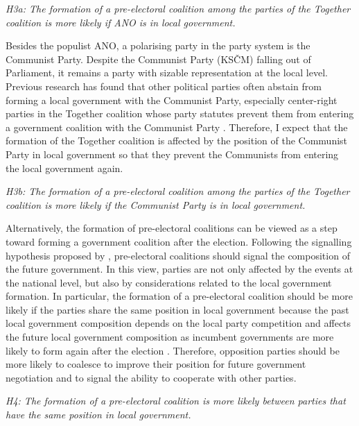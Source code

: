 \documentclass[]{interact}
\theoremstyle{plain}%
\theoremstyle{definition}
\theoremstyle{remark}
\begin{document}
\vspace{12pt}
\textit{H3a: The formation of a pre-electoral coalition among the parties of the Together coalition is more likely if ANO is in local government.\label{hyp:3.1}}
\vspace{12pt}

Besides the populist ANO, a polarising party in the party system is the Communist Party.
Despite the Communist Party (KSČM) falling out of Parliament, it remains a party with sizable representation at the local level. Previous research has found that other political parties often abstain from forming a local government with the Communist Party, especially center-right parties in the Together coalition whose party statutes prevent them from entering a government coalition with the Communist Party \citep{skvrnak2021}. Therefore, I expect that the formation of the Together coalition is affected by the position of the Communist Party in local government so that they prevent the Communists from entering the local government again.

\vspace{12pt}
\textit{H3b: The formation of a pre-electoral coalition among the parties of the Together coalition is more likely if the Communist Party is in local government.\label{hyp:3.2}}
\vspace{12pt}

Alternatively, the formation of pre-electoral coalitions can be viewed as a step toward forming a government coalition after the election. Following the signalling hypothesis proposed by \citet{golder2005}, pre-electoral coalitions should signal the composition of the future government. In this view, parties are not only affected by the events at the national level, but also by considerations related to the local government formation. 
In particular, the formation of a pre-electoral coalition should be more likely if the parties share the same position in local government because the past local government composition depends on the local party competition and affects the future local government composition as incumbent governments are more likely to form again after the election \citep{back2008}. Therefore, opposition parties should be more likely to coalesce to improve their position for future government negotiation and to signal the ability to cooperate with other parties. 

\vspace{12pt}
\textit{H4: The formation of a pre-electoral coalition is more likely between parties that have the same position in local government.\label{hyp:4.1}}
\vspace{12pt}
\end{document}
